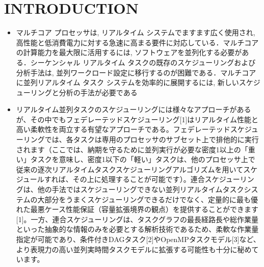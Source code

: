 
\section{INTRODUCTION}
\label{sec: introduction}

\begin{frame}{}
    \begin{itemize}
        \item マルチコア プロセッサは, リアルタイム システムでますます広く使用され, 高性能と低消費電力に対する急速に高まる要件に対応している．マルチコアの計算能力を最大限に活用するには, ソフトウェアを並列化する必要がある．シーケンシャル リアルタイム タスクの既存のスケジューリングおよび分析手法は, 並列ワークロード設定に移行するのが困難である．マルチコアに並列リアルタイム タスク システムを効率的に展開するには, 新しいスケジューリングと分析の手法が必要である
    \end{itemize}
\end{frame}

\begin{frame}{}
    \begin{itemize}
        \item リアルタイム並列タスクのスケジューリングには様々なアプローチがあるが、その中でもフェデレーテッドスケジューリング[1]はリアルタイム性能と高い柔軟性を両立する有望なアプローチである。フェデレーテッドスケジューリングでは、各タスクは専用のプロセッサのサブセット上で排他的に実行されます（ここでは、納期を守るために並列実行が必要な密度1以上の「重い」タスクを意味し、密度1以下の「軽い」タスクは、他のプロセッサ上で従来の逐次リアルタイムタスクスケジューリングアルゴリズムを用いてスケジュールすれば、その上に処理することが可能です）。連合スケジューリングは、他の手法ではスケジューリングできない並列リアルタイムタスクシステムの大部分をうまくスケジューリングできるだけでなく、定量的に最も優れた最悪ケース性能保証（容量拡張境界の観点）を提供することができます[1]。一方、連合スケジューリングは、タスクグラフの最長経路長や総作業量といった抽象的な情報のみを必要とする解析技術であるため、柔軟な作業量指定が可能であり、条件付きDAGタスク[2]やOpenMPタスクモデル[3]など、より表現力の高い並列実時間タスクモデルに拡張する可能性も十分に秘めています。
    \end{itemize}
\end{frame}

